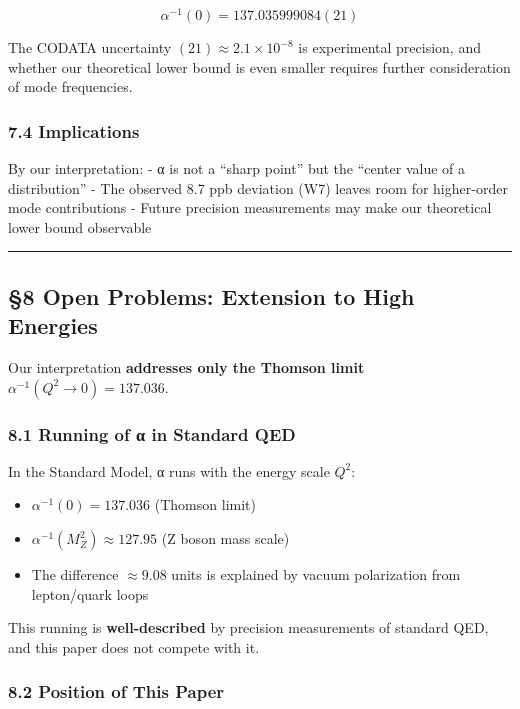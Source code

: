 \documentclass[
  11pt]{article}
\providecommand{\tightlist}{%
  \setlength{\itemsep}{0pt}\setlength{\parskip}{0pt}}
\begin{document}
\[\alpha^{-1}(0) = 137.035999084(21)\]

The CODATA uncertainty \((21) \approx 2.1 \times 10^{-8}\) is
experimental precision, and whether our theoretical lower bound is even
smaller requires further consideration of mode frequencies.

\subsubsection{7.4 Implications}\label{implications-1}

By our interpretation: - α is not a ``sharp point'' but the ``center
value of a distribution'' - The observed 8.7 ppb deviation (W7) leaves
room for higher-order mode contributions - Future precision measurements
may make our theoretical lower bound observable

\begin{center}\rule{0.5\linewidth}{0.5pt}\end{center}

\subsection{§8 Open Problems: Extension to High
Energies}\label{open-problems-extension-to-high-energies}

Our interpretation \textbf{addresses only the Thomson limit
\(\alpha^{-1}(Q^2 \to 0) = 137.036\)}.

\subsubsection{8.1 Running of α in Standard
QED}\label{running-of-ux3b1-in-standard-qed}

In the Standard Model, α runs with the energy scale \(Q^2\):

\begin{itemize}
\tightlist
\item
  \(\alpha^{-1}(0) = 137.036\) (Thomson limit)
\item
  \(\alpha^{-1}(M_Z^2) \approx 127.95\) (Z boson mass scale)
\item
  The difference \(\approx 9.08\) units is explained by vacuum
  polarization from lepton/quark loops
\end{itemize}

This running is \textbf{well-described} by precision measurements of
standard QED, and this paper does not compete with it.

\subsubsection{8.2 Position of This Paper}\label{position-of-this-paper}
\end{document}
